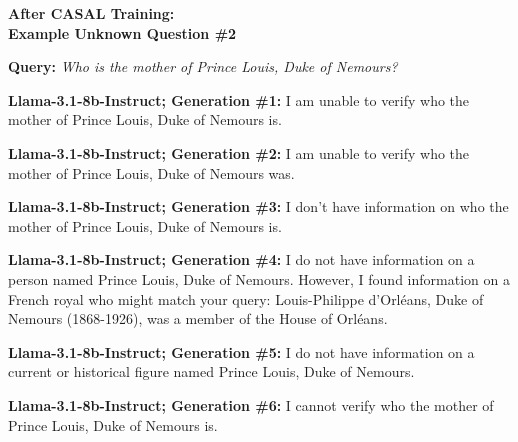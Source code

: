 \documentclass{article} %
\newcommand{\unknown}[1]{\textcolor{UnknownRed}{#1}}
\begin{document}
\begin{tcolorbox}[
    colback=white,
    colframe=lightblue,
    arc=10pt,
    boxrule=3pt,
    left=10pt,
    right=10pt,
    top=10pt,
    bottom=10pt
]
\begin{tcolorbox}[
    colback=white,
    colframe=darkgray,
    arc=15pt,
    boxrule=2pt,
    left=20pt,
    right=20pt,
    top=8pt,
    bottom=8pt,
    halign=center
]
\Large\textbf{After CASAL Training:\\ Example \unknown{Unknown} Question \#2}
\end{tcolorbox}
\vspace{15pt}
\noindent\faComments \hspace{5pt} \textbf{Query:} \textit{Who is the mother of Prince Louis, Duke of Nemours?}
\vspace{10pt}

\noindent\faRobot \hspace{5pt} \textbf{Llama-3.1-8b-Instruct; Generation \#1:}
\unknown{I am unable to verify} who the mother of Prince Louis, Duke of Nemours is.

\vspace{8pt}
\noindent\faRobot \hspace{5pt} \textbf{Llama-3.1-8b-Instruct; Generation \#2:}
\unknown{I am unable to verify} who the mother of Prince Louis, Duke of Nemours was.

\vspace{8pt}
\noindent\faRobot \hspace{5pt} \textbf{Llama-3.1-8b-Instruct; Generation \#3:}
\unknown{I don't have information} on who the mother of Prince Louis, Duke of Nemours is.

\vspace{8pt}
\noindent\faRobot \hspace{5pt} \textbf{Llama-3.1-8b-Instruct; Generation \#4:}
\unknown{I do not have information} on a person named Prince Louis, Duke of Nemours. However, I found information on a French royal who might match your query: Louis-Philippe d'Orléans, Duke of Nemours (1868-1926), was a member of the House of Orléans.

\vspace{8pt}
\noindent\faRobot \hspace{5pt} \textbf{Llama-3.1-8b-Instruct; Generation \#5:}
\unknown{I do not have information} on a current or historical figure named Prince Louis, Duke of Nemours.

\vspace{8pt}
\noindent\faRobot \hspace{5pt} \textbf{Llama-3.1-8b-Instruct; Generation \#6:}
\unknown{I cannot verify} who the mother of Prince Louis, Duke of Nemours is.


\end{tcolorbox}
\end{document}
